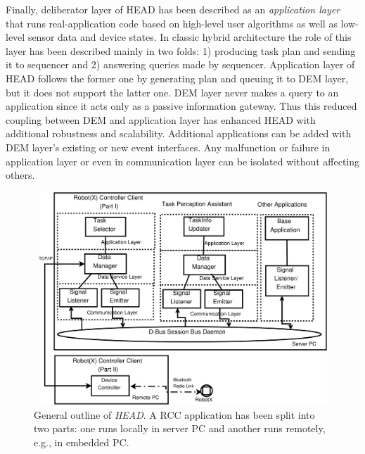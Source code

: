 \documentclass{ifacconf}
\begin{document}
Finally, deliberator layer of HEAD has been described as an {\em application layer} that runs real-application code based on high-level user algorithms as well as low-level sensor data and device states. In classic hybrid architecture the role of this layer has been described mainly in two folds: 1) producing task plan and sending it to sequencer and 2) answering queries made by sequencer. Application layer of HEAD follows the former one by generating plan and queuing it to DEM layer, but it does not support the latter one. DEM layer never makes a query to an application since it acts only as a passive information gateway. Thus this reduced coupling between DEM and application layer has enhanced HEAD with additional robustness and scalability. Additional applications can be added with DEM layer's existing or new event interfaces. Any malfunction or failure in application layer or even in communication layer can be isolated without affecting others. 
\begin{figure}
\begin{center}
\includegraphics[width=12cm,height=8cm]{./dia-files/concrete-arch} %
\caption{General outline of {\em HEAD}. A RCC application has been split into two parts: one runs locally in server PC and another runs remotely, e.g., in embedded PC.} 
\label{fig:concrete-arch}
\end{center}
\end{figure}
\end{document}
